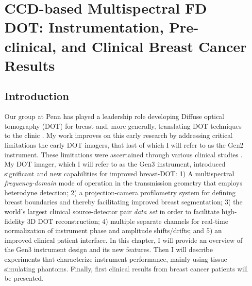 \chapter{CCD-based Multispectral FD DOT: Instrumentation, Pre-clinical, and Clinical Breast Cancer Results}
\section{Introduction}
Our group at Penn has played a leadership role developing Diffuse optical tomography (DOT) for breast and, more generally, translating DOT techniques to the clinic \cite{corlu_03_1,culver_03_3,Holboke2000,Ntziachristos1999,Ntziachristos2001,Ntziachristos2000,Ntziachristos2002,OLeary1996,Zhu1999}. My work improves on this early research by addressing critical limitations the early DOT imagers, that last of which I will refer to as the Gen2 instrument. These limitations were ascertained through various clinical studies \cite{choe_05_1,choe_09_1,corlu_07_1,corlu_03_1,corlu_05_1,culver_03_1}. My DOT imager, which I will refer to as the Gen3 instrument,  introduced significant and new capabilities for improved breast-DOT: 1) A multispectral \textit{frequency-domain} mode of operation in the transmission geometry that employs heterodyne detection; 2) a projection-camera profilometry system for defining breast boundaries and thereby facilitating improved breast segmentation; 3) the world’s largest clinical source-detector pair \textit{data set} in order to facilitate high-fidelity 3D DOT reconstruction; 4) multiple separate channels for real-time normalization of instrument phase and amplitude shifts/drifts; and 5) an improved clinical patient interface. In this chapter, I will provide an overview of the Gen3 instrument design and its new features. Then I will describe experiments that characterize  instrument performance, mainly using tissue simulating phantoms. Finally, first clinical results from breast cancer patients will be presented.

